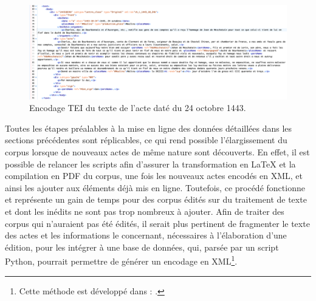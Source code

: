 \begin{figure}[H]
    \centering
    \includegraphics[scale=0.33]{front/images/encodage_text.png}
    \caption{Encodage TEI du texte de l'acte daté du 24 octobre 1443.}
    \label{fig:encodage_1443}
\end{figure} 

\par Toutes les étapes préalables à la mise en ligne des données détaillées dans les sections précédentes sont réplicables, ce qui rend possible l'élargissement du corpus lorsque de nouveaux actes de même nature sont découverts. En effet, il est possible de relancer les scripts afin d'assurer la transformation en LaTeX et la compilation en PDF du corpus, une fois les nouveaux actes encodés en XML, et ainsi les ajouter aux éléments déjà mis en ligne. Toutefois, ce procédé fonctionne et représente un gain de temps pour des corpus édités sur du traitement de texte et dont les inédits ne sont pas trop nombreux à ajouter. Afin de traiter des corpus qui n'auraient pas été édités, il serait plus pertinent de fragmenter le texte des actes et les informations le concernant, nécessaires à l'élaboration d'une édition, pour les intégrer à une base de données, qui, parsée par un script Python, pourrait permettre de générer un encodage en XML\footnote{Cette méthode est développé dans : \cite{devaleriolaOrdinateurAuService2020}.}. 

\newpage
\thispagestyle{empty}
\mbox{}
\newpage